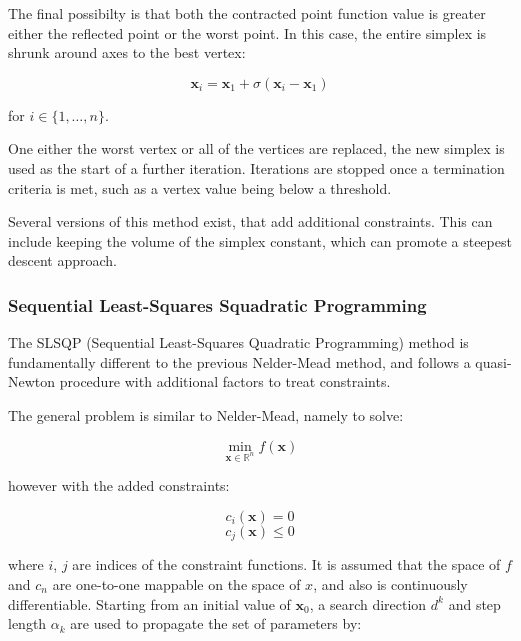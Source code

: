 The final possibilty is that both the contracted point function value is greater 
either the reflected point or the worst point. In this case, the entire simplex
is shrunk around axes to the best vertex:

\begin{equation}
\mathbf{x}_i = \mathbf{x}_1 + \sigma \left(\mathbf{x}_i - \mathbf{x}_1 \right)
\end{equation}

for $i \in \{1, \dots, n\}$.

One either the worst vertex or all of the vertices are replaced, the new simplex
is used as the start of a further iteration. Iterations are stopped once a termination
criteria is met, such as a vertex value being below a threshold.

Several versions of this method exist, that add additional constraints. This can
include keeping the volume of the simplex constant, which can promote a steepest
descent approach.

\subsubsection{Sequential Least-Squares Squadratic Programming}
\label{subsubsec:slsqp}
The SLSQP (Sequential Least-Squares Quadratic Programming) method is fundamentally
different to the previous Nelder-Mead method, and follows a quasi-Newton procedure
with additional factors to treat constraints.

The general problem is similar to Nelder-Mead, namely to solve:

\begin{equation}
\min_{\mathbf{x} \in \mathbb{R}^n} f\left( \mathbf{x}\right)
\end{equation}

however with the added constraints:

\begin{equation}
c_i \left(\mathbf{x} \right) = 0
\end{equation}
\begin{equation}
c_j \left(\mathbf{x} \right) \leq 0
\end{equation}

where $i$, $j$ are indices of the constraint functions.
It is assumed that the space of $f$ and $c_n$ are one-to-one mappable on the
space of $x$, and also is continuously differentiable. Starting from an initial
value of $\mathbf{x}_0$, a search direction $d^k$ and step length $\alpha_k$ are
used to propagate the set of parameters by:

